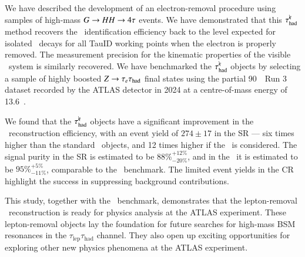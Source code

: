     We have described the development of an electron-removal procedure 
    using samples of high-mass $G \rightarrow HH \rightarrow 4\tau$ events. We have demonstrated 
    that this $\tau_\mathrm{had}^{e\mkern-9mu\backslash}$ method recovers the \tauhad\ identification 
    efficiency back to the level expected for isolated \tauhad\ decays 
    for all TauID working points when the electron is properly removed. 
    The measurement precision for the kinematic properties of the 
    visible \tauhad\ system is similarly recovered. We have benchmarked 
    the $\tau_\mathrm{had}^{e\mkern-9mu\backslash}$ objects by selecting a sample of highly boosted 
    $Z\rightarrow\tau_e\tau_{\text{had}}$ final states using the partial 90~\ifb\ Run 3 dataset 
    recorded by the ATLAS detector in 2024 at a centre-of-mass energy of 13.6~\TeV.

    We found that the $\tau_\mathrm{had}^{e\mkern-9mu\backslash}$ objects have a significant improvement 
    in the \teth\ reconstruction efficiency, with an event yield of 
    $274 \pm 17$ in the SR --- six times higher than the standard \tauhad\ 
    objects, and 12 times higher if the \SRtight\ is considered. 
    The signal purity in the SR is estimated to be $88\%^{+12\%}_{-20\%}$, 
    and in the \SRtight\ it is estimated to be $95\%^{+5\%}_{-11\%}$, 
    comparable to the \tauhadmurm\ benchmark. The limited event yields 
    in the CR highlight the success in suppressing background contributions.

    This study, together with the \tauhadmurm\ benchmark, demonstrates 
    that the lepton-removal \tauhad\ reconstruction is ready for physics 
    analysis at the ATLAS experiment. These lepton-removal objects lay the 
    foundation for future searches for high-mass BSM resonances in the 
    $\tau_\text{lep}\tau_\text{had}$ channel. They also open up exciting 
    opportunities for exploring other new physics phenomena at the 
    ATLAS experiment. 